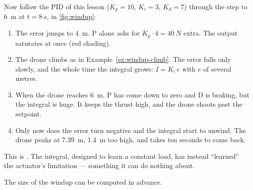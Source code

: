 Now follow the PID of this lesson ($K_p = 10$, $K_i = 3$, $K_d = 7$) through the step to \SI{6}{m} at $t = \SI{8}{s}$, in \cref{fig:windup}:
\begin{enumerate}
  \item The error jumps to \SI{4}{m}. P alone asks for $K_p\cdot 4 = \SI{40}{N}$ extra. The output saturates at once (red shading).
  \item The drone climbs as in Example~\ref{ex:windup-climb}. The error falls only slowly, and the whole time the integral grows: $\dot I = K_i\,e$ with $e$ of several metres.
  \item When the drone reaches \SI{6}{m}, P has come down to zero and D is braking, but the integral is huge. It keeps the thrust high, and the drone shoots past the setpoint.
  \item Only now does the error turn negative and the integral start to unwind. The drone peaks at \SI{7.39}{m}, \SI{1.4}{m} too high, and takes ten seconds to come back.
\end{enumerate}
This is . The integral, designed to learn a constant load, has instead \enquote{learned} the actuator's limitation — something it can do nothing about.


The size of the windup can be computed in advance.

